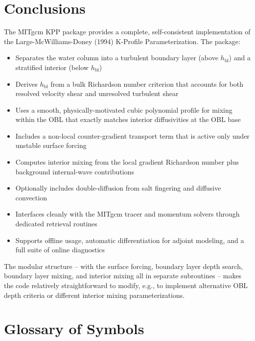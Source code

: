 \documentclass[12pt,letterpaper]{article}
\newcommand{\hbl}{h_{\mathrm{bl}}}
\begin{document}
\section{Conclusions}  
  
The MITgcm KPP package provides a complete, self-consistent implementation  
of the Large-McWilliams-Doney (1994) K-Profile Parameterization. The  
package:  
  
\begin{itemize}  
  \item Separates the water column into a turbulent boundary layer  
        (above $\hbl$) and a stratified interior (below $\hbl$)  
  \item Derives $\hbl$ from a bulk Richardson number criterion that  
        accounts for both resolved velocity shear and unresolved  
        turbulent shear  
  \item Uses a smooth, physically-motivated cubic polynomial profile  
        for mixing within the OBL that exactly matches interior  
        diffusivities at the OBL base  
  \item Includes a non-local counter-gradient transport term that  
        is active only under unstable surface forcing  
  \item Computes interior mixing from the local gradient Richardson  
        number plus background internal-wave contributions  
  \item Optionally includes double-diffusion from salt fingering and  
        diffusive convection  
  \item Interfaces cleanly with the MITgcm tracer and momentum solvers  
        through dedicated retrieval routines  
  \item Supports offline usage, automatic differentiation for adjoint  
        modeling, and a full suite of online diagnostics  
\end{itemize}  
  
The modular structure -- with the surface forcing, boundary layer  
depth search, boundary layer mixing, and interior mixing all in  
separate subroutines -- makes the code relatively straightforward  
to modify, e.g., to implement alternative OBL depth criteria or  
different interior mixing parameterizations.  
  
\section{Glossary of Symbols}  
\label{sec:glossary}  
  
\end{document}
